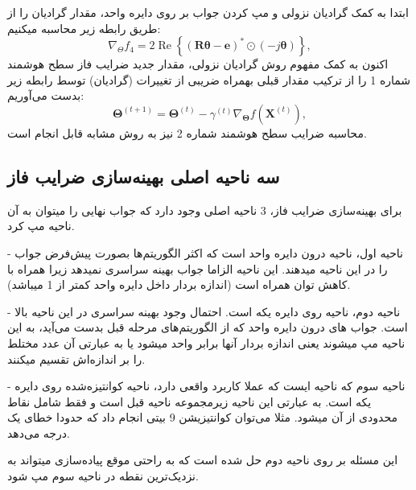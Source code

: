 ابتدا به کمک گرادیان نزولی و مپ کردن جواب بر روی دایره واحد، مقدار گرادیان را از طریق رابطه زیر محاسبه میکنیم:
\[
\nabla_{\Theta} f_{4}=2 \operatorname{Re}\left\{(\mathbf{R \theta}-\mathbf{e})^{*} \odot(-j \mathbf{\theta})\right\},
\]
اکنون به کمک مفهوم روش  گرادیان نزولی، مقدار جدید ضرایب فاز سطح هوشمند شماره 1 را از ترکیب مقدار قبلی بهمراه ضریبی از تغییرات (گرادیان) توسط رابطه زیر بدست می‌آوریم:
\[
\boldsymbol{\Theta}^{(t+1)}=\boldsymbol{\Theta}^{(t)}-\gamma^{(t)} \nabla_{\boldsymbol{\Theta}} f\left(\mathbf{X}^{(t)}\right),
\]
محاسبه ضرایب سطح هوشمند شماره 2 نیز به روش مشابه قابل انجام است.
\newpage
\subsection{سه ناحیه اصلی بهینه‌سازی ضرایب فاز}
برای بهینه‌سازی ضرایب فاز، 3 ناحیه اصلی وجود دارد که جواب نهایی را میتوان به آن ناحیه مپ کرد.

- ناحیه اول، ناحیه درون دایره واحد است که اکثر الگوریتم‌ها بصورت پیش‌فرض جواب را در این ناحیه میدهند. این ناحیه الزاما جواب بهینه سراسری نمیدهد زیرا همراه با کاهش توان همراه است (اندازه بردار داخل دایره واحد کمتر از 1 میباشد). 

- ناحیه دوم، ناحیه روی دایره یکه است. احتمال وجود بهینه‌ سراسری در این ناحیه بالا است. جواب های درون دایره واحد که از الگوریتم‌های مرحله قبل بدست می‌آید، به این ناحیه مپ میشوند یعنی اندازه بردار آنها برابر واحد میشود یا به عبارتی آن عدد مختلط را بر اندازه‌اش تقسیم میکنند.

- ناحیه سوم که ناحیه ایست که عملا کاربرد واقعی دارد، ناحیه کوانتیزه‌شده روی دایره یکه است. به عبارتی این ناحیه زیرمجموعه ناحیه قبل است و فقط شامل نقاط محدودی از آن میشود.  مثلا می‌توان کوانتیزیشن 9 بیتی انجام داد که حدودا خطای یک درجه می‌دهد.

این مسئله بر روی ناحیه دوم حل شده است که به راحتی موقع پیاده‌سازی میتواند به نزدیک‌ترین نقطه در ناحیه سوم مپ شود.
\newpage
‌